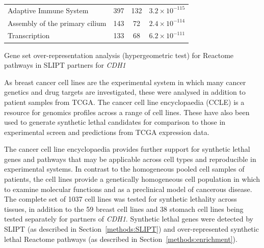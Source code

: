 \begin{table}[!b]
{\begin{threeparttable}
\begin{tabular}{lccc}
  \rowcolor{black!5}
  Adaptive Immune System & 397 & 132 & $3.2 \times 10^{-115}$ \\ 
  \rowcolor{black!10}
  Assembly of the primary cilium & 143 &  72 & $2.4 \times 10^{-114}$ \\ 
  \rowcolor{black!5}
  Transcription & 133 &  68 & $6.2 \times 10^{-111}$ \\ 
   \hline
\end{tabular}
\begin{tablenotes}
\raggedright \small
Gene set over-representation analysis (hypergeometric test) for Reactome pathways in \gls{SLIPT} partners for \textit{CDH1}
\end{tablenotes}
\end{threeparttable}
}
\end{table}

As breast cancer cell lines are the experimental system in which many cancer genetics and drug targets are investigated, these were analysed in addition to patient samples from TCGA. The cancer cell line encyclopaedia (CCLE) is a resource for genomics profiles across a range of cell lines. These have also been used to generate synthetic lethal candidates for comparison to those in experimental screen and predictions from TCGA expression data.

The cancer cell line encyclopaedia provides further support for synthetic lethal genes and pathways that may be applicable across cell types and reproducible in experimental systems. In contrast to the homogeneous pooled cell samples of patients,  the cell lines provide a genetically homogeneous cell population in which to examine molecular functions and as a preclinical model of cancerous disease. The complete set of 1037 cell lines was tested for synthetic lethality across tissues, in addition to the 59 breast cell lines and 38 stomach cell lines being tested separately for partners of \textit{CDH1}. Synthetic lethal genes were detected by \gls{SLIPT} (as described in Section~\ref{methods:SLIPT}) and over-represented synthetic lethal Reactome pathways (as described in Section~\ref{methods:enrichment}). 

